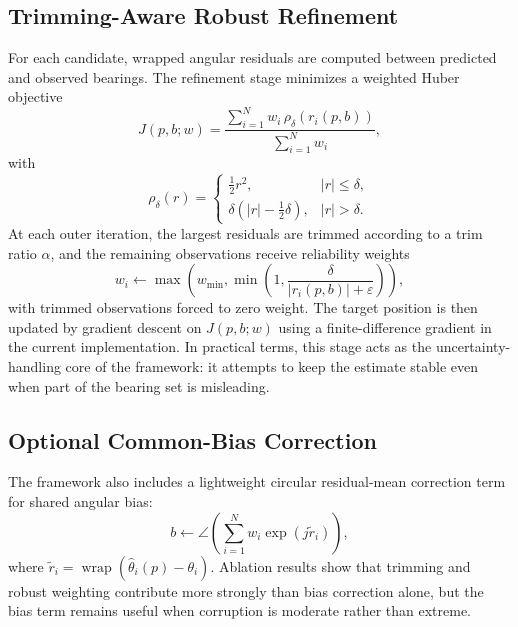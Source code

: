 \documentclass[preprint,12pt]{elsarticle}
\begin{document}
\subsection{Trimming-Aware Robust Refinement}

For each candidate, wrapped angular residuals are computed between predicted and observed bearings. The refinement stage minimizes a weighted Huber objective
\begin{equation}
J(p,b;w)=\frac{\sum_{i=1}^{N} w_i \, \rho_{\delta}\!\left(r_i(p,b)\right)}{\sum_{i=1}^{N} w_i},
\end{equation}
with
\begin{equation}
\rho_{\delta}(r)=
\begin{cases}
\frac{1}{2}r^2, & |r|\le \delta,\\
\delta\left(|r|-\frac{1}{2}\delta\right), & |r|>\delta.
\end{cases}
\end{equation}
At each outer iteration, the largest residuals are trimmed according to a trim ratio $\alpha$, and the remaining observations receive reliability weights
\begin{equation}
w_i \leftarrow \max \left(w_{\min}, \min\left(1,\frac{\delta}{|r_i(p,b)|+\varepsilon}\right)\right),
\end{equation}
with trimmed observations forced to zero weight. The target position is then updated by gradient descent on $J(p,b;w)$ using a finite-difference gradient in the current implementation. In practical terms, this stage acts as the uncertainty-handling core of the framework: it attempts to keep the estimate stable even when part of the bearing set is misleading.

\subsection{Optional Common-Bias Correction}

The framework also includes a lightweight circular residual-mean correction term for shared angular bias:
\begin{equation}
b \leftarrow \angle \left(\sum_{i=1}^{N} w_i \exp\!\left(j \tilde{r}_i\right)\right),
\end{equation}
where $\tilde{r}_i=\operatorname{wrap}(\hat{\theta}_i(p)-\theta_i)$. Ablation results show that trimming and robust weighting contribute more strongly than bias correction alone, but the bias term remains useful when corruption is moderate rather than extreme.
\end{document}

